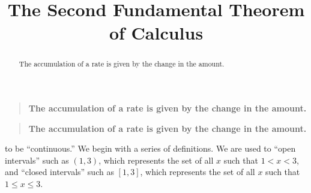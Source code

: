 \documentclass{ximera}
\title[Dig-In:]{The Second Fundamental Theorem of Calculus}
\begin{document}
\begin{abstract}
The accumulation of a rate is given by the change in the amount.
\end{abstract}
\maketitle

\begin{quote}\large\textbf{The \textcolor{green!70!black!70!blue}{accumulation} of a \textcolor{blue!70!green}{rate} is given by the \textcolor{purple!50!blue!90!black}{change in the amount}.}
\end{quote}
% 
\begin{quote}\large\textbf{The accumulation of a rate is given by the change in the amount.}
\end{quote}


to be ``continuous.'' We begin with a series of definitions. We are
used to ``open intervals'' such as $(1,3)$, which represents the set
of all $x$ such that $1<x<3$, and ``closed intervals'' such as
$[1,3]$, which represents the set of all $x$ such that $1\leq x\leq
3$. 
\end{document}

